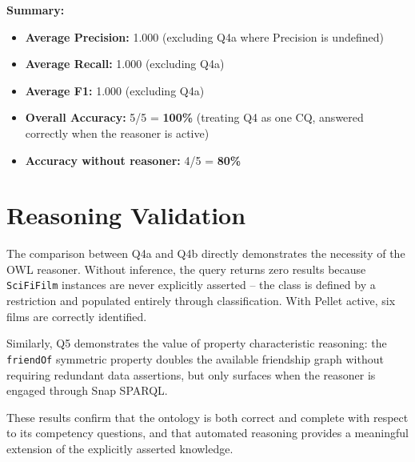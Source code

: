 \vspace{0.3cm}
\noindent\textbf{Summary:}
\begin{itemize}
    \item \textbf{Average Precision:} 1.000 (excluding Q4a where Precision is undefined)
    \item \textbf{Average Recall:} 1.000 (excluding Q4a)
    \item \textbf{Average F1:} 1.000 (excluding Q4a)
    \item \textbf{Overall Accuracy:} 5/5 = \textbf{100\%} (treating Q4 as one CQ, answered correctly when the reasoner is active)
    \item \textbf{Accuracy without reasoner:} 4/5 = \textbf{80\%}
\end{itemize}

\section*{Reasoning Validation}

The comparison between Q4a and Q4b directly demonstrates the necessity of the OWL reasoner. Without inference, the query returns zero results because \texttt{SciFiFilm} instances are never explicitly asserted -- the class is defined by a restriction and populated entirely through classification. With Pellet active, six films are correctly identified.

Similarly, Q5 demonstrates the value of property characteristic reasoning: the \texttt{friendOf} symmetric property doubles the available friendship graph without requiring redundant data assertions, but only surfaces when the reasoner is engaged through Snap SPARQL.

\noindent These results confirm that the ontology is both correct and complete with respect to its competency questions, and that automated reasoning provides a meaningful extension of the explicitly asserted knowledge.